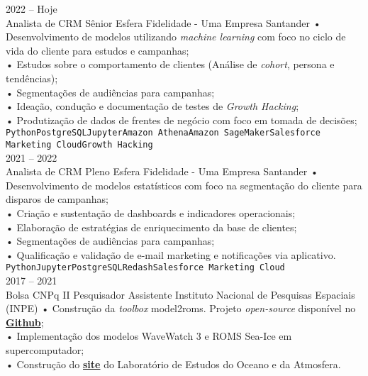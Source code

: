 \documentclass[9pt]{developercv} %
\begin{document}
\begin{entrylist}
	\entry
		{2022 --  Hoje\\}
		{Analista de CRM Sênior}
		{Esfera Fidelidade - Uma Empresa Santander}
		{• Desenvolvimento de modelos utilizando \textit{machine learning} com foco no ciclo de vida do cliente para estudos e campanhas;\\
		• Estudos sobre o comportamento de clientes (Análise de \textit{cohort}, persona e tendências);\\ 
		• Segmentações de audiências para campanhas;\\
		• Ideação, condução e documentação de testes de \textit{Growth Hacking};\\
		• Produtização de dados de frentes de negócio com foco em tomada de decisões;\\
		\texttt{Python}\slashsep\texttt{PostgreSQL}\slashsep\texttt{Jupyter}\slashsep\texttt{Amazon Athena}\slashsep\texttt{Amazon SageMaker}\slashsep\texttt{Salesforce Marketing Cloud}\slashsep\texttt{Growth Hacking}}
		\\\entry
		{2021 --  2022\\}
		{Analista de CRM Pleno}
		{Esfera Fidelidade - Uma Empresa Santander}
		{• Desenvolvimento de modelos estatísticos com foco na segmentação do cliente para disparos de campanhas;\\
		• Criação e sustentação de dashboards e indicadores operacionais;\\
		• Elaboração de estratégias de enriquecimento da base de clientes;\\
		• Segmentações de audiências para campanhas;\\
		• Qualificação e validação de e-mail marketing e notificações via aplicativo.\\
		\texttt{Python}\slashsep\texttt{Jupyter}\slashsep\texttt{PostgreSQL}\slashsep\texttt{Redash}\slashsep\texttt{Salesforce Marketing Cloud}}
		\\\entry
		{2017 -- 2021\\\footnotesize{Bolsa CNPq II}}
		{Pesquisador Assistente}
		{Instituto Nacional de Pesquisas Espaciais (INPE)}
		{• Construção da \textit{toolbox} model2roms. Projeto \textit{open-source} disponível no \href{https://github.com/uesleisutil/model2roms}{\textcolor{bleu_cite}{\textbf{Github}}}; \\	
		• Implementação dos modelos WaveWatch 3 e ROMS Sea-Ice em supercomputador;\\
		• Construção do \href{https://loa-inpe.github.io/}{\textcolor{bleu_cite}{\textbf{site}}} do Laboratório de Estudos do Oceano e da Atmosfera. \\
}
\end{entrylist}
\end{document}
